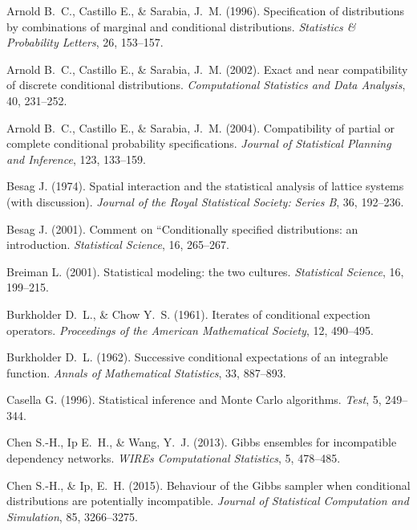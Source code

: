 \documentclass[12pt,a4paper]{article}
\begin{document}
\begin{thebibliography}{40}
Arnold B.~C., Castillo E., \& Sarabia, J.~M. (1996).
Specification of distributions by combinations of marginal and conditional distributions.
\emph{Statistics \& Probability Letters}, 26, 153--157.

Arnold B.~C., Castillo E., \& Sarabia, J.~M. (2002).
Exact and near compatibility of discrete conditional distributions.
\emph{Computational Statistics and Data Analysis}, 40, 231--252.

Arnold B.~C., Castillo E., \& Sarabia, J.~M. (2004).
Compatibility of partial or complete conditional probability specifications.
\emph{Journal of Statistical Planning and Inference}, 123, 133--159.

Besag J. (1974).
Spatial interaction and the statistical analysis of lattice systems (with discussion).
\emph{Journal of the Royal Statistical Society: Series B}, 36, 192--236.

Besag J. (2001).
Comment on ``Conditionally specified distributions: an introduction.
\emph{Statistical Science}, 16, 265--267.

Breiman L. (2001).
Statistical modeling: the two cultures.
\emph{Statistical Science}, 16, 199--215.

Burkholder D.~L., \& Chow Y.~S. (1961).
Iterates of conditional expection operators.
\emph{Proceedings of the American Mathematical Society}, 12, 490--495.

Burkholder D.~L. (1962).
Successive conditional expectations of an integrable function.
\emph{Annals of Mathematical Statistics}, 33, 887--893.

Casella G. (1996).
Statistical inference and Monte Carlo algorithms.
\emph{Test}, 5, 249--344.

Chen S.-H., Ip E.~H., \& Wang, Y.~J. (2013).
Gibbs ensembles for incompatible dependency networks.
\emph{WIREs Computational Statistics}, 5, 478--485.

Chen S.-H., \& Ip, E.~H. (2015).
Behaviour of the Gibbs sampler when conditional distributions are potentially incompatible.
\emph{Journal of Statistical Computation and Simulation}, 85, 3266--3275.


\end{thebibliography}
\end{document}
